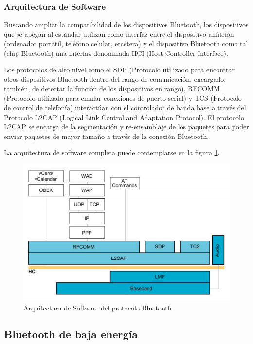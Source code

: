 \subsubsection{Arquitectura de Software}
Buscando ampliar la compatibilidad de los dispositivos Bluetooth, los dispositivos que se apegan al estándar utilizan como interfaz entre el dispositivo anfitrión (ordenador portátil, teléfono celular, etcétera) y el dispositivo Bluetooth como tal (chip Bluetooth) una interfaz denominada HCI (Host Controller Interface).

Los protocolos de alto nivel como el SDP (Protocolo utilizado para encontrar otros dispositivos Bluetooth dentro del rango de comunicación, encargado, también, de detectar la función de los dispositivos en rango), RFCOMM (Protocolo utilizado para emular conexiones de puerto serial) y TCS (Protocolo de control de telefonía) interactúan con el controlador de banda base a través del Protocolo L2CAP (Logical Link Control and Adaptation Protocol). El protocolo L2CAP se encarga de la segmentación y re-ensamblaje de los paquetes para poder enviar paquetes de mayor tamaño a través de la conexión Bluetooth. 

La arquitectura de software completa puede contemplarse en la figura \ref{figure:bluetoothsw}.

\begin{figure}[h] \centering
	\includegraphics[width=15cm]{graphs/bluetooth_arquitectura_protocolos.png}
	\caption{Arquitectura de Software del protocolo Bluetooth \cite{codificacion}}
	\label{figure:bluetoothsw} 
\end{figure}

\subsection{Bluetooth de baja energía}

